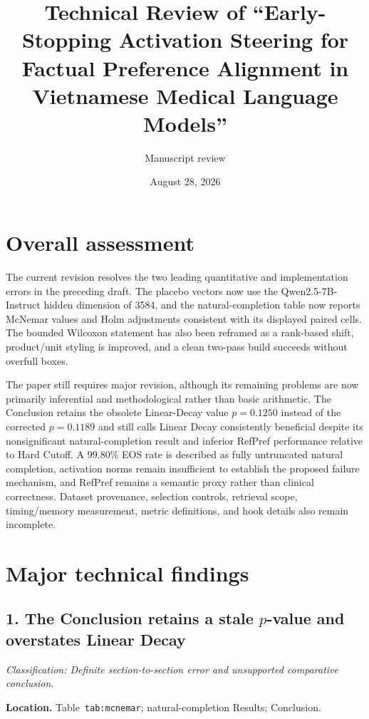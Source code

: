 \documentclass[11pt]{article}
\title{Technical Review of ``Early-Stopping Activation Steering for Factual Preference Alignment in Vietnamese Medical Language Models''}
\author{Manuscript review}
\date{August 28, 2026}
\newcommand{\findinglabel}[1]{\textbf{#1}}
\newcommand{\classification}[1]{\textit{Classification: #1.}}
\begin{document}
\maketitle

\section*{Overall assessment}

The current revision resolves the two leading quantitative and implementation errors in the preceding draft.  The placebo vectors now use the Qwen2.5-7B-Instruct hidden dimension of 3584, and the natural-completion table now reports McNemar values and Holm adjustments consistent with its displayed paired cells.  The bounded Wilcoxon statement has also been reframed as a rank-based shift, product/unit styling is improved, and a clean two-pass build succeeds without overfull boxes.

The paper still requires major revision, although its remaining problems are now primarily inferential and methodological rather than basic arithmetic.  The Conclusion retains the obsolete Linear-Decay value $p=0.1250$ instead of the corrected $p=0.1189$ and still calls Linear Decay consistently beneficial despite its nonsignificant natural-completion result and inferior RefPref performance relative to Hard Cutoff.  A 99.80\% EOS rate is described as fully untruncated natural completion, activation norms remain insufficient to establish the proposed failure mechanism, and RefPref remains a semantic proxy rather than clinical correctness.  Dataset provenance, selection controls, retrieval scope, timing/memory measurement, metric definitions, and hook details also remain incomplete.

\section*{Major technical findings}

\subsection*{1. The Conclusion retains a stale $p$-value and overstates Linear Decay}

\classification{Definite section-to-section error and unsupported comparative conclusion}

\findinglabel{Location.} Table~\texttt{tab:mcnemar}; natural-completion Results; Conclusion.
\end{document}

